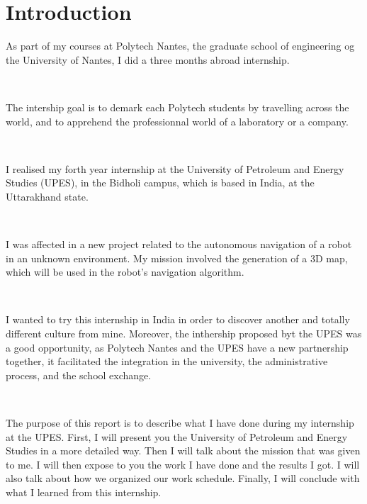 \chapter{Introduction}

As part of my courses at Polytech Nantes, the graduate school of engineering og the University of Nantes, I did a three months abroad internship. 

~~

The intership goal is to demark each Polytech students by travelling across the world, and to apprehend the professionnal world of a laboratory or a company.

~~

I realised my forth year internship at the University of Petroleum and Energy Studies (UPES), in the Bidholi campus, which is based in India, at the Uttarakhand state.

~~

I was affected in a new project related to the autonomous navigation of a robot in an unknown environment. My mission involved the generation of a 3D map, which will be used in the robot's navigation algorithm.

~~

I wanted to try this internship in India in order to discover another and totally different culture from mine. Moreover, the inthership proposed byt the UPES was a good opportunity, as Polytech Nantes and the UPES have a new partnership together, it facilitated the integration in the university, the administrative process, and the school exchange. 

~~

The purpose of this report is to describe what I have done during my internship at the UPES. First, I will present you the University of Petroleum and Energy Studies in a more detailed way. Then I will talk about the mission that was given to me. I will then expose to you the work I have done and the results I got. I will also talk about how we organized our work schedule. Finally, I will conclude with what I learned from this internship.

